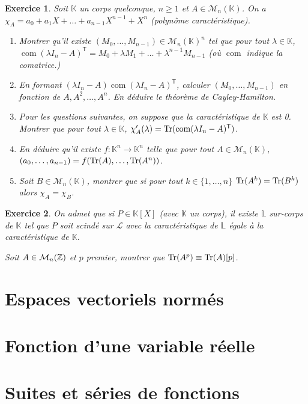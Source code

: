 \documentclass[12pt]{article}
\newtheorem{exercise}{Exercice}[section]
\theoremstyle{remark}
\theoremstyle{remark}
\newcommand{\K}{\mathbb{K}} \newcommand{\R}{\mathbb{R}}
\newcommand{\M}{\mathcal{M}} \renewcommand{\L}{\mathcal{L}}
\DeclareMathOperator{\com}{com}
\begin{document}
\begin{exercise}
	Soit $\K$ un corps quelconque, $n\geqslant1$ et $A\in\M_{n}(\K)$. On a $\chi_{A}=a_{0}+a_{1}X+\dots+a_{n-1}X^{n-1}+X^{n}$ (polynôme caractéristique).
	\begin{enumerate}
		\item Montrer qu'il existe $(M_{0},\dots,M_{n-1})\in\M_{n}(\K)^{n}$ tel que pour tout $\lambda\in\K$, $\com(\lambda I_{n}-A)^{\mathsf{T}}=M_{0}+\lambda M_{1}+\dots+\lambda^{n-1}M_{n-1}$ (où $\com$ indique la comatrice.)
		\item En formant $(\lambda I_{n}-A)\com(\lambda I_{n}-A)^{\mathsf{T}}$, calculer $(M_{0},\dots,M_{n-1})$ en fonction de $A,A^{2},\dots,A^{n}$. En déduire le théorème de Cayley-Hamilton.
		\item Pour les questions suivantes, on suppose que la caractéristique de $\K$ est 0. Montrer que pour tout $\lambda\in\K$, $\chi_{A}'(\lambda)=\Tr(\com(\lambda I_{n}-A)^{\mathsf{T}})$.
		\item En déduire qu'il existe $f:\K^{n}\to\K^{n}$ telle que pour tout $A\in\M_{n}(\K)$, $(a_{0},\dots,a_{n-1}) = f(\operatorname{Tr}(A),\dots,\operatorname{Tr}(A^{n}))$.
		\item Soit $B\in\M_{n}(\K)$, montrer que si pour tout $k\in\{1,\dots,n\}$ $\operatorname{Tr}(A^{k})=\operatorname{Tr}(B^{k})$ alors $\chi_{A}=\chi_{B}$.
	\end{enumerate}
\end{exercise}

\begin{exercise}
	On admet que si $P\in\K[X]$ (avec $\K$ un corps), il existe $\mathbb{L}$ sur-corps de $\K$ tel que $P$ soit scindé sur $\L$ avec la caractéristique de $\mathbb{L}$ égale à la caractéristique de $\K$.

	Soit $A\in\M_{n}(\Z)$ et $p$ premier, montrer que $\operatorname{Tr}(A^{p})\equiv\operatorname{Tr}(A)[p]$.
\end{exercise}

\cleardoublepage
\section{Espaces vectoriels normés}
\cleardoublepage
\section{Fonction d'une variable réelle}
\cleardoublepage
\section{Suites et séries de fonctions}
\cleardoublepage
\end{document}
